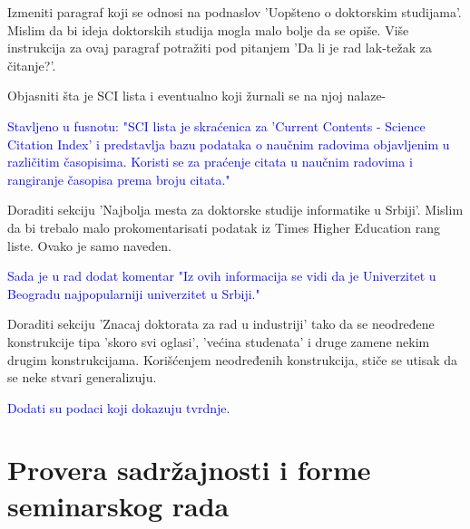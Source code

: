 \documentclass[a4paper]{report}
\newcommand{\odgovor}[1]{\textcolor{blue}{#1}}
\begin{document}
Izmeniti paragraf koji se odnosi na podnaslov 'Uopšteno o doktorskim studijama'. Mislim da bi ideja 
doktorskih studija mogla malo bolje da se opiše. Više instrukcija za ovaj paragraf potražiti pod 
pitanjem 'Da li je rad lak-težak za čitanje?'.

Objasniti šta je SCI lista i eventualno koji žurnali se na njoj nalaze-

\odgovor{Stavljeno u fusnotu: "{}SCI lista je skraćenica za 'Current Contents - Science Citation Index' i predstavlja bazu podataka o naučnim radovima objavljenim u različitim časopisima. Koristi se za praćenje citata u naučnim radovima i rangiranje časopisa prema broju citata."{} }

Doraditi sekciju 'Najbolja mesta za doktorske studije informatike u Srbiji'. Mislim da bi trebalo malo prokomentarisati podatak iz Times Higher Education rang liste. Ovako je samo naveden.

\odgovor{Sada je u rad dodat komentar "{}Iz ovih informacija se vidi da je Univerzitet u Beogradu najpopularniji univerzitet u Srbiji."{}}

Doraditi sekciju 'Znacaj doktorata za rad u industriji' tako da se neodređene konstrukcije tipa 'skoro 
svi oglasi', 'većina studenata' i druge zamene nekim drugim konstrukcijama. Korišćenjem neodređenih 
konstrukcija, stiče se utisak da se neke stvari generalizuju. 

\odgovor{Dodati su podaci koji dokazuju tvrdnje.}

\section{Provera sadržajnosti i forme seminarskog rada}
\end{document}
